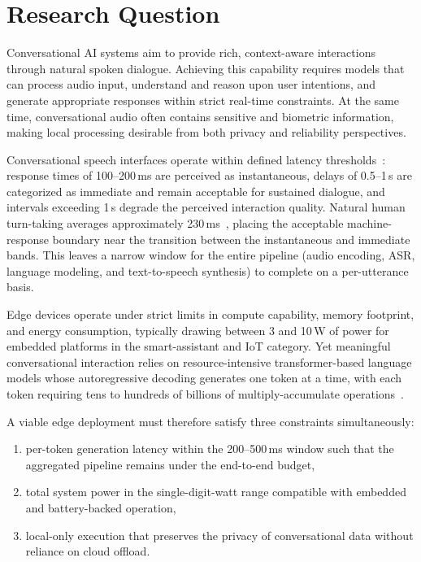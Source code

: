 \section{Research Question}
\label{sec:research_question}

Conversational AI systems aim to provide rich, context-aware interactions through
natural spoken dialogue. Achieving this capability requires models that can process
audio input, understand and reason upon user intentions, and generate appropriate
responses within strict real-time constraints. At the same time, conversational
audio often contains sensitive and biometric information, making local processing
desirable from both privacy and reliability perspectives.

Conversational speech interfaces operate within defined latency
thresholds~\cite{doherty2015flow,defossez2025moshi}: response times of
100--200\,ms are perceived as instantaneous, delays of 0.5--1\,s are categorized as
immediate and remain acceptable for sustained dialogue, and intervals exceeding
1\,s degrade the perceived interaction quality. Natural human turn-taking averages
approximately 230\,ms~\cite{defossez2025moshi}, placing the acceptable
machine-response boundary near the transition between the instantaneous and
immediate bands. This leaves a narrow window for the entire pipeline (audio
encoding, ASR, language modeling, and text-to-speech synthesis) to complete on a
per-utterance basis.

Edge devices operate under strict limits in compute capability, memory footprint,
and energy consumption, typically drawing between 3 and 10\,W of power for embedded
platforms in the smart-assistant and IoT category. Yet meaningful conversational
interaction relies on resource-intensive transformer-based language models whose
autoregressive decoding generates one token at a time, with each token requiring
tens to hundreds of billions of multiply-accumulate operations~\cite{pope2022efficiently}.

A viable edge deployment must therefore satisfy three constraints simultaneously:
\begin{enumerate}[label=(\roman*)]
    \item per-token generation latency within the 200--500\,ms window such that the aggregated pipeline remains under the end-to-end budget,
    \item total system power in the single-digit-watt range compatible with embedded and battery-backed operation,
    \item local-only execution that preserves the privacy of conversational data without reliance on cloud offload.
\end{enumerate}

